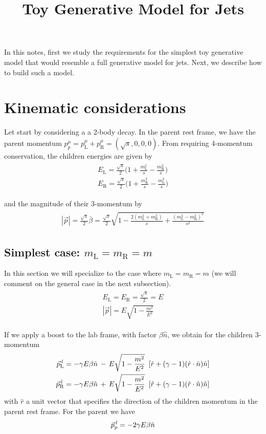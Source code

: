 \documentclass[12pt]{article}
\newcommand{\bea}{\begin{eqnarray}\begin{aligned}}
\newcommand{\eea}{\end{aligned}\end{eqnarray}}
\begin{document}
\title{Toy Generative Model for Jets}
\maketitle


In this notes, first we study the requirements for the simplest toy generative model that would resemble a full generative model for jets. Next, we describe how to build such a model.

\section{Kinematic considerations}

Let start by considering a a 2-body decay. In the parent rest frame, we have the parent momentum $p^\mu_p=p^\mu_{\text{L}}+p^\mu_{\text{R}}=(\sqrt{s}, 0, 0, 0)$. From requiring 4-momentum conservation, the children energies are given by
\bea
E_{\text{L}}=\frac{\sqrt{s}}{2}\bigg(1+\frac{m_{\text{L}}^2}{s}-\frac{m_{\text{R}}^2}{s} \bigg) \\
E_{\text{R}}=\frac{\sqrt{s}}{2}\bigg(1+\frac{m_{\text{R}}^2}{s}-\frac{m_{\text{L}}^2}{s} \bigg)
\eea

and the magnitude of their 3-momentum by
\bea\label{eq:Prestframe}
|\vec{p}| =\frac{\sqrt{s}}{2} \bar{\beta}=\frac{\sqrt{s}}{2} \sqrt{1-\frac{2 (m_{\text{L}}^2+m_{\text{R}}^2)}{s}+\frac{(m_{\text{L}}^2-m_{\text{R}}^2)^2}{s^2}}
\eea



\subsection{Simplest case:  $m_{\text{L}}=m_{\text{R}}=m$}
In this section we will specialize to the case where $m_{\text{L}}=m_{\text{R}}=m$ (we will comment on the general case in the next subsection).
\bea
E_{\text{L}}=E_{\text{R}}=\frac{\sqrt{s}}{2} = E \\
|\vec{p}| =E \sqrt{1-\frac{m^2}{E^2}}
\eea


If we  apply a boost to the lab frame, with factor $\beta \hat{n}$, we obtain for the children 3-momentum
\bea\label{eq:pChildLab}
\vec{p}^{\it{\,l}}_{\text{L}} = - \gamma E \beta \hat{n} \,-\,  E \sqrt{1-\frac{m^2}{E^2}} \,\,\,[ \hat{r} + (\gamma -1) (\hat{r} \cdot \hat{n}) \hat{n} ] \\
\vec{p}^{\it{\,l}}_{\text{R}}= - \gamma E \beta \hat{n} \,+\,  E \sqrt{1-\frac{m^2}{E^2}} \,\,\,[ \hat{r} + (\gamma -1) (\hat{r} \cdot \hat{n}) \hat{n} ]
\eea
with $\hat{r}$ a unit vector that specifies the direction of the children momentum in the parent rest frame. For the parent we have 
\bea\label{eq:pParentLab}
\vec{p}^{\it{\,l}}_p= - 2 \gamma E \beta \hat{n} 
\eea
\end{document}
